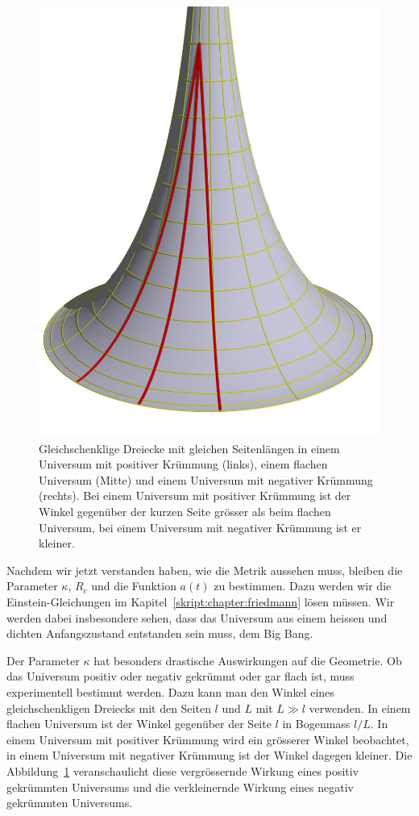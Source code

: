 \begin{figure}
\includegraphics[height=6truecm]{chapters/3d/negativ.jpg}
\caption{Gleichschenklige Dreiecke mit gleichen Seitenlängen in einem
Universum mit positiver Krümmung (links), einem flachen Universum (Mitte)
und einem Universum mit negativer Krümmung (rechts).
Bei einem Universum mit positiver Krümmung ist der Winkel gegenüber
der kurzen Seite grösser als beim flachen Universum, bei einem
Universum mit negativer Krümmung ist er kleiner.
\label{skript:robertson:vergroesserung}}
\end{figure}
Nachdem wir jetzt verstanden haben, wie die Metrik aussehen muss,
bleiben die Parameter $\kappa$, $R_c$ und die Funktion $a(t)$
zu bestimmen.
Dazu werden wir die Einstein-Gleichungen im
Kapitel~\ref{skript:chapter:friedmann} lösen müssen.
Wir werden dabei insbesondere sehen, dass das Universum aus einem
heissen und dichten Anfangszustand entstanden sein muss, dem Big Bang.

Der Parameter $\kappa$ hat besonders drastische
Auswirkungen auf die Geometrie.
Ob das Universum positiv oder negativ gekrümmt oder gar flach ist,
muss experimentell bestimmt werden.
Dazu kann man den Winkel eines gleichschenkligen Dreiecks mit den
Seiten $l$ und $L$ mit $L\gg l$ verwenden.
In einem flachen Universum ist der Winkel gegenüber der Seite $l$
in Bogenmass $l/L$.
In einem Universum mit positiver Krümmung wird ein grösserer Winkel
beobachtet, in einem Universum mit negativer Krümmung ist der Winkel
dagegen kleiner.
Die Abbildung~\ref{skript:robertson:vergroesserung} veranschaulicht
diese vergrössernde Wirkung eines positiv gekrümmten Universums
und die verkleinernde Wirkung eines negativ gekrümmten Universums.

